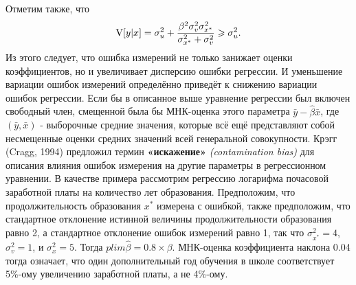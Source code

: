 Отметим также, что
\[
\mathrm{V}[y|x]=\sigma^2_u+\frac{{\beta}^2\sigma^2_v\sigma^2_{x^*}}{\sigma^2_{x^*}+\sigma^2_v}\geqslant \sigma^2_u.
\]
Из этого следует, что ошибка измерений не только занижает оценки коэффициентов, но и увеличивает дисперсию ошибки регрессии. И уменьшение вариации ошибок измерений определённо приведёт к снижению вариации ошибок регрессии.
Если бы в описанное выше уравнение регрессии был включен свободный член, смещенной была бы МНК-оценка этого параметра $\bar{y} - \widehat{\beta}\bar{x}$,  где $(\bar y, \bar x)$ - выборочные средние значения, которые всё ещё представляют собой несмещенные оценки средних значений всей генеральной совокупности. Крэгг (Cragg, 1994) предложил термин {\bf «искажение»} \emph{(contamination bias)} для описания влияния ошибок измерения на другие параметры в регрессионном уравнении.
В качестве примера рассмотрим регрессию логарифма почасовой заработной платы на количество лет образования. Предположим, что продолжительность образования $x^*$ измерена с ошибкой, также предположим, что стандартное отклонение истинной величины продолжительности образования равно 2, а стандартное отклонение ошибок измерений равно 1, так что $\sigma^2_{x^*}=4$, $\sigma^2_v=1$, и $\sigma^2_x=5$. Тогда $plim\widehat{\beta}=0.8 \times \beta$. МНК-оценка коэффициента наклона 0.04 тогда означает, что один дополнительный год обучения в школе соответствует 5\%-ому увеличению заработной платы, а не 4\%-ому.

